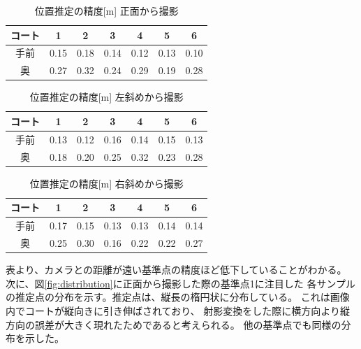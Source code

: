 \documentclass[twoside,twocolumn]{jsarticle}
\begin{document}
    \begin{table}[h]
        \caption{位置推定の精度[m] 正面から撮影}
        \label{tab:accuracy_front}
        \centering
        \small
        \begin{tabular}{c|cccccc}
            コート & 1 & 2 & 3 & 4 & 5 & 6 \\ \hline \hline
            手前 & 0.15 & 0.18 & 0.14 & 0.12 & 0.13 & 0.10 \\
            奥 & 0.27 & 0.32 & 0.24 & 0.29 & 0.19 & 0.28
        \end{tabular}
    \end{table}
    \begin{table}[h]
        \caption{位置推定の精度[m] 左斜めから撮影}
        \label{tab:accuracy_left}
        \centering
        \small
        \begin{tabular}{c|cccccc}
            コート & 1 & 2 & 3 & 4 & 5 & 6 \\ \hline \hline
            手前 & 0.13 & 0.12 & 0.16 & 0.14 & 0.15 & 0.13 \\
            奥 & 0.18 & 0.20 & 0.25 & 0.32 & 0.23 & 0.28
        \end{tabular}
    \end{table}
    \begin{table}[h]
        \caption{位置推定の精度[m] 右斜めから撮影}
        \label{tab:accuracy_right}
        \centering
        \small
        \begin{tabular}{c|cccccc}
            コート & 1 & 2 & 3 & 4 & 5 & 6 \\ \hline \hline
            手前 & 0.17 & 0.15 & 0.13 & 0.13 & 0.14 & 0.14 \\
            奥 & 0.25 & 0.30 & 0.16 & 0.22 & 0.22 & 0.27
        \end{tabular}
    \end{table}

    表より、カメラとの距離が遠い基準点の精度ほど低下していることがわかる。
    次に、図\ref{fig:distribution}に正面から撮影した際の基準点1に注目した
    各サンプルの推定点の分布を示す。推定点は、縦長の楕円状に分布している。
    これは画像内でコートが縦向きに引き伸ばされており、
    射影変換をした際に横方向より縦方向の誤差が大きく現れたためであると考えられる。
    他の基準点でも同様の分布を示した。
\end{document}
